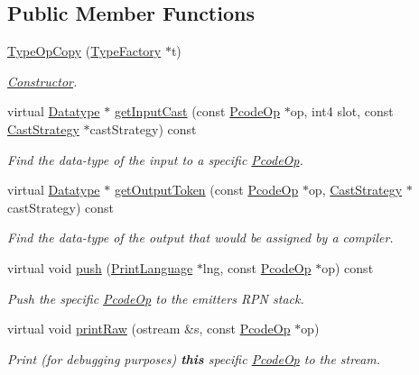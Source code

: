 \subsection*{Public Member Functions}
\begin{DoxyCompactItemize}
\item 
\mbox{\hyperlink{class_type_op_copy_a566e9d481a5ecc686ae9479c9dec4208}{Type\+Op\+Copy}} (\mbox{\hyperlink{class_type_factory}{Type\+Factory}} $\ast$t)
\begin{DoxyCompactList}\small\item\em \mbox{\hyperlink{class_constructor}{Constructor}}. \end{DoxyCompactList}\item 
virtual \mbox{\hyperlink{class_datatype}{Datatype}} $\ast$ \mbox{\hyperlink{class_type_op_copy_a95594caad35bce30d7167b3cecb76e7f}{get\+Input\+Cast}} (const \mbox{\hyperlink{class_pcode_op}{Pcode\+Op}} $\ast$op, int4 slot, const \mbox{\hyperlink{class_cast_strategy}{Cast\+Strategy}} $\ast$cast\+Strategy) const
\begin{DoxyCompactList}\small\item\em Find the data-\/type of the input to a specific \mbox{\hyperlink{class_pcode_op}{Pcode\+Op}}. \end{DoxyCompactList}\item 
virtual \mbox{\hyperlink{class_datatype}{Datatype}} $\ast$ \mbox{\hyperlink{class_type_op_copy_a2a8b45de9ac53dd673c289e1c13feb08}{get\+Output\+Token}} (const \mbox{\hyperlink{class_pcode_op}{Pcode\+Op}} $\ast$op, \mbox{\hyperlink{class_cast_strategy}{Cast\+Strategy}} $\ast$cast\+Strategy) const
\begin{DoxyCompactList}\small\item\em Find the data-\/type of the output that would be assigned by a compiler. \end{DoxyCompactList}\item 
virtual void \mbox{\hyperlink{class_type_op_copy_a630b0d476ae53202c12db4e466cfad4f}{push}} (\mbox{\hyperlink{class_print_language}{Print\+Language}} $\ast$lng, const \mbox{\hyperlink{class_pcode_op}{Pcode\+Op}} $\ast$op) const
\begin{DoxyCompactList}\small\item\em Push the specific \mbox{\hyperlink{class_pcode_op}{Pcode\+Op}} to the emitter\textquotesingle{}s R\+PN stack. \end{DoxyCompactList}\item 
virtual void \mbox{\hyperlink{class_type_op_copy_a637e83726874a26ba653e6db34d0bb1b}{print\+Raw}} (ostream \&s, const \mbox{\hyperlink{class_pcode_op}{Pcode\+Op}} $\ast$op)
\begin{DoxyCompactList}\small\item\em Print (for debugging purposes) {\bfseries{this}} specific \mbox{\hyperlink{class_pcode_op}{Pcode\+Op}} to the stream. \end{DoxyCompactList}\end{DoxyCompactItemize}
